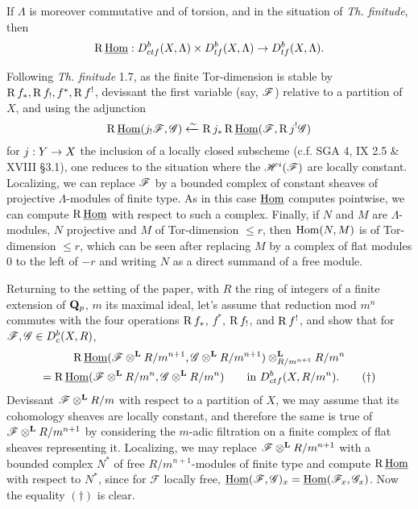 \documentclass[deligne.tex]{subfiles}
\begin{document}
\begin{corollary*}
    If $\Lambda$ is moreover commutative and of torsion,
    and in the situation of \textit{Th. finitude}, then
    \begin{equation*}
    \operatorname{R}\underline{\operatorname{Hom}}:D^b_{ctf}(X,\Lambda)\times D^b_{tf}(X,\Lambda)
    \rightarrow D^b_{tf}(X,\Lambda).
    \end{equation*}
\end{corollary*}
Following \textit{Th. finitude} 1.7, as the finite Tor-dimension is stable
by $\operatorname{R} f_\ast,\operatorname{R} f_!, f^\ast,\operatorname{R} f^!$, devissant the first variable
(say, $\mathscr F$) relative to a partition of $X$, and using the adjunction
\begin{equation*}
    \operatorname{R}\underline{\operatorname{Hom}}(j_! \mathscr F, \mathscr G)
    \xleftarrow{\sim} \operatorname{R} j_\ast\operatorname{R}\underline{\operatorname{Hom}}(\mathscr F,\operatorname{R} j^! \mathscr G)
\end{equation*}
for $j:Y\rightarrow X$ the inclusion of a locally closed subscheme
(c.f. SGA 4, IX 2.5 \& XVIII \S3.1), one reduces to the situation
where the $\mathscr H^i(\mathscr F)$ are locally constant. Localizing, we can replace
$\mathscr F$ by a bounded complex of constant sheaves of projective
$\Lambda$-modules of finite type. As in this case $\underline{\operatorname{Hom}}$ computes
pointwise, we can compute $\operatorname{R}\underline{\operatorname{Hom}}$ with respect to such a complex.
Finally, if $N$ and $M$ are $\Lambda$-modules, $N$ projective and $M$ of
Tor-dimension $\leq r$, then $\operatorname{Hom}(N,M)$ is of Tor-dimension $\leq r$,
which can be seen after replacing $M$ by a complex of flat
modules $0$ to the left of $-r$ and writing $N$ as a direct summand of a
free module.

Returning to the setting of the paper, with $R$ the ring of integers of a
finite extension of $\mathbf{Q}_p$, $m$ its maximal ideal,
let's assume that reduction mod $m^n$ commutes with the four operations
$\operatorname{R} f_\ast$, $f^\ast$, $\operatorname{R} f_!$, and $\operatorname{R} f^!$, and show that for
$\mathscr F, \mathscr G\in D_c^b(X,R)$,
\begin{multline*}
    \operatorname{R}\underline{\operatorname{Hom}}(\mathscr F\otimes^{\mathbf{L}} R/m^{n+1},\mathscr G\otimes^{\mathbf{L}} R/m^{n+1})
    \otimes^{\mathbf{L}}_{R/m^{n+1}}R/m^n \\
    =\operatorname{R}\underline{\operatorname{Hom}}(\mathscr F\otimes^{\mathbf{L}} R/m^n,\mathscr G\otimes^{\mathbf{L}} R/m^n)
    \qquad\text{in }D^b_{ctf}(X,R/m^n).
    \tag{$\dagger$}
\end{multline*}
Devissant $\mathscr F\otimes^{\mathbf{L}} R/m$ with respect to a partition of $X$,
we may assume that its cohomology sheaves are locally constant, and therefore
the same is true of $\mathscr F\otimes^{\mathbf{L}} R/m^{n+1}$ by considering the $m$-adic
filtration on a finite complex of flat sheaves representing it.
Localizing, we may replace $\mathscr F\otimes^{\mathbf{L}} R/m^{n+1}$ with a bounded complex 
$N^\ast$ of free $R/m^{n+1}$-modules of finite type and compute
$\operatorname{R}\underline{\operatorname{Hom}}$ with respect to $N^\ast$, since for $\mathscr F$ locally free,
$\underline{\operatorname{Hom}}(\mathscr F,\mathscr G)_x=\underline{\operatorname{Hom}}(\mathscr F_x,\mathscr G_x)$.
Now the equality $(\dagger)$ is clear.
\end{document}
